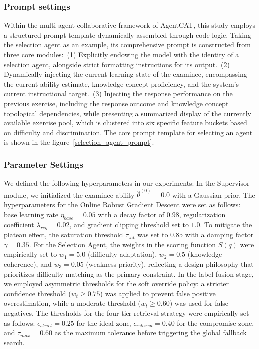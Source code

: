 \subsubsection{Prompt settings}
Within the multi-agent collaborative framework of AgentCAT, this study employs a structured prompt template dynamically assembled through code logic. Taking the selection agent as an example, its comprehensive prompt is constructed from three core modules:~(1) Explicitly endowing the model with the identity of a selection agent, alongside strict formatting instructions for its output.~(2) Dynamically injecting the current learning state of the examinee, encompassing the current ability estimate, knowledge concept proficiency, and the system's current instructional target.~(3) Injecting the response performance on the previous exercise, including the response outcome and knowledge concept topological dependencies, while presenting a summarized display of the currently available exercise pool, which is clustered into six specific feature buckets based on difficulty and discrimination. The core prompt template for selecting an agent is shown in the figure~\ref{selection_agent_prompt}.



\subsubsection{Parameter Settings}
We defined the following hyperparameters in our experiments: In the Supervisor module, we initialized the examinee ability $\hat{\theta}^{(0)} = 0.0$ with a Gaussian prior. The hyperparameters for the Online Robust Gradient Descent were set as follows: base learning rate $\eta_{base} = 0.05$ with a decay factor of $0.98$, regularization coefficient $\lambda_{reg} = 0.02$, and gradient clipping threshold set to $1.0$. To mitigate the plateau effect, the saturation threshold $\tau_{sat}$ was set to $0.85$ with a damping factor $\gamma = 0.35$. For the Selection Agent, the weights in the scoring function $S(q)$ were empirically set to $w_1 = 5.0$ (difficulty adaptation), $w_2 = 0.5$ (knowledge coherence), and $w_3 = 0.05$ (weakness priority), reflecting a design philosophy that prioritizes difficulty matching as the primary constraint. In the label fusion stage, we employed asymmetric thresholds for the soft override policy: a stricter confidence threshold ($w_t \ge 0.75$) was applied to prevent false positive overestimation, while a moderate threshold ($w_t \ge 0.60$) was used for false negatives. The thresholds for the four-tier retrieval strategy were empirically set as follows: $\epsilon_{strict} = 0.25$ for the ideal zone, $\epsilon_{relaxed} = 0.40$ for the compromise zone, and $\tau_{max} = 0.60$ as the maximum tolerance before triggering the global fallback search.


